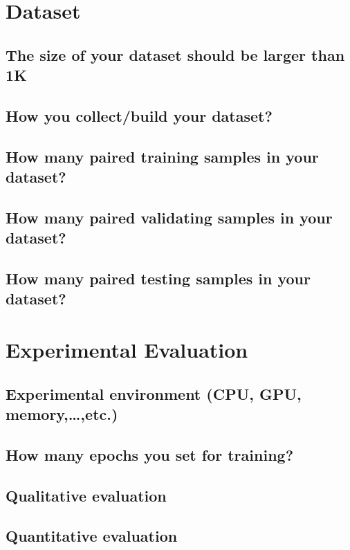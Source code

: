 \documentclass{beamer}
\begin{document}
\begin{CJK}{UTF8}{nkai}
\section{Dataset}
\subsection{The size of your dataset should be larger than 1K}
\subsection{How you collect/build your dataset?}
\subsection{How many paired training samples in your dataset?}
\subsection{How many paired validating samples in your dataset?}
\subsection{How many paired testing samples in your dataset?}

\section{Experimental Evaluation}
\subsection{Experimental environment (CPU, GPU, memory,…,etc.)}
\subsection{How many epochs you set for training?}
\subsection{Qualitative evaluation}
\subsection{Quantitative evaluation}


\end{CJK}
\end{document}
